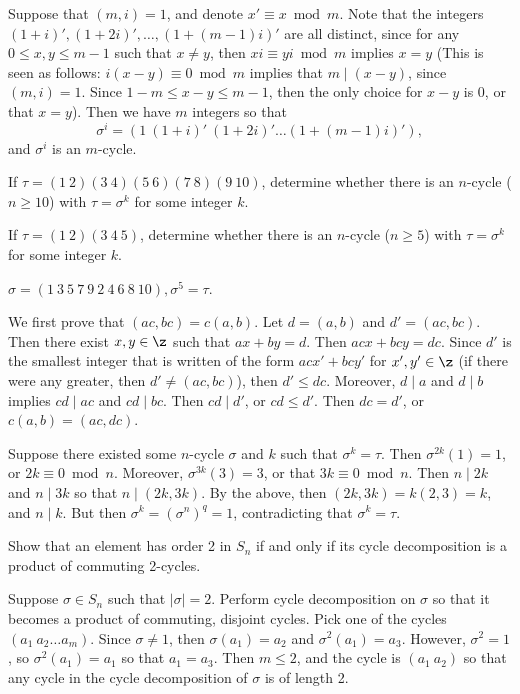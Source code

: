 \begin{problems}
\begin{sol}
        Suppose that $(m, i) = 1$, and denote $x' \equiv x \bmod m$. Note that the integers $(1 + i)', (1 + 2i)', \ldots, (1 + (m - 1)i)'$ are all distinct, since for any $0 \leq x, y \leq m - 1$ such that $x \neq y$, then $xi \equiv yi \bmod m$ implies $x = y$ (This is seen as follows: $i(x - y) \equiv 0 \bmod m$ implies that $m \mid (x - y)$, since $(m, i) = 1$. Since $1 - m \leq x - y \leq m - 1$, then the only choice for $x - y$ is 0, or that $x = y$). Then we have $m$ integers so that
        $$\sigma^i = (1\ (1 + i)'\ (1 + 2i)'\ldots (1 + (m - 1)i)'),$$
        and $\sigma^i$ is an $m$-cycle.
    \end{sol}
    \item
    \begin{problems}
        \item If $\tau = (1\ 2)(3\ 4)(5\ 6)(7\ 8)(9\ 10)$, determine whether there is an $n$-cycle ($n \ge 10$) with $\tau = \sigma^k$ for some integer $k$.
        \item If $\tau = (1\ 2)(3\ 4\ 5)$, determine whether there is an $n$-cycle ($n \ge 5$) with $\tau = \sigma^k$ for some integer $k$.
    \end{problems}
    \begin{solalph}
        \item $\sigma = (1\ 3\ 5\ 7\ 9\ 2\ 4\ 6\ 8\ 10), \sigma^5 = \tau$.
        \item We first prove that $(ac, bc) = c(a, b)$. Let $d = (a, b)$ and $d' = (ac, bc)$. Then there exist $x, y \in \z$ such that $ax + by = d$. Then $acx + bcy = dc$. Since $d'$ is the smallest integer that is written of the form $acx' + bcy'$ for $x', y' \in \z$ (if there were any greater, then $d' \neq (ac, bc)$), then $d' \leq dc$. Moreover, $d \mid a$ and $d \mid b$ implies $cd \mid ac$ and $cd \mid bc$. Then $cd \mid d'$, or $cd \leq d'$. Then $dc = d'$, or $c(a, b) = (ac, dc)$.
        
        Suppose there existed some $n$-cycle $\sigma$ and $k$ such that $\sigma^k = \tau$. Then $\sigma^{2k}(1) = 1$, or $2k \equiv 0 \bmod n$. Moreover, $\sigma^{3k}(3) = 3$, or that $3k \equiv 0 \bmod n$. Then $n \mid 2k$ and $n \mid 3k$ so that $n \mid (2k,3k)$. By the above, then $(2k, 3k) = k(2, 3) = k$, and $n \mid k$. But then $\sigma^k = (\sigma^n)^q = 1$, contradicting that $\sigma^k = \tau$.
    \end{solalph}
    \item Show that an element has order 2 in $S_n$ if and only if its cycle decomposition is a product of commuting 2-cycles.
    \begin{sol}
        Suppose $\sigma \in S_n$ such that $|\sigma| = 2$. Perform cycle decomposition on $\sigma$ so that it becomes a product of commuting, disjoint cycles. Pick one of the cycles $(a_1\ a_2 \ldots a_m)$. Since $\sigma \neq 1$, then $\sigma(a_1) = a_2$ and $\sigma^2(a_1) = a_3$. However, $\sigma^2 = 1$, so $\sigma^2(a_1) = a_1$ so that $a_1 = a_3$. Then $m \leq 2$, and the cycle is $(a_1\ a_2)$ so that any cycle in the cycle decomposition of $\sigma$ is of length 2.
        

\end{sol}
\end{problems}
